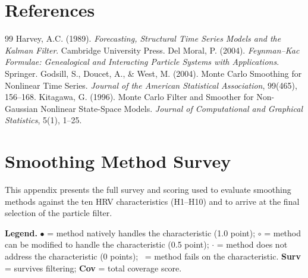 \documentclass[11pt, a4paper]{article}
\theoremstyle{plain}
\theoremstyle{definition}
\begin{document}
\section*{References}
\begin{thebibliography}{99}
Harvey, A.C. (1989). \textit{Forecasting, Structural Time Series Models and the Kalman Filter}. Cambridge University Press.
Del Moral, P. (2004). \textit{Feynman--Kac Formulae: Genealogical and Interacting Particle Systems with Applications}. Springer.
Godsill, S., Doucet, A., \& West, M. (2004). Monte Carlo Smoothing for Nonlinear Time Series. \textit{Journal of the American Statistical Association}, 99(465), 156--168.
Kitagawa, G. (1996). Monte Carlo Filter and Smoother for Non-Gaussian Nonlinear State-Space Models. \textit{Journal of Computational and Graphical Statistics}, 5(1), 1--25.
\end{thebibliography}

\appendix

\section{Smoothing Method Survey}\label{app:smoothing-survey}

This appendix presents the full survey and scoring used to evaluate
smoothing methods against the ten HRV characteristics (H1--H10) and to
arrive at the final selection of the particle filter.

\textbf{Legend.} $\bullet$ = method natively handles the characteristic (1.0
point); $\circ$ = method can be modified to handle the characteristic (0.5
point); $\cdot$ = method does not address the characteristic (0 points);
~= method fails on the characteristic. \textbf{Surv} = survives
filtering; \textbf{Cov} = total coverage score.
\end{document}
